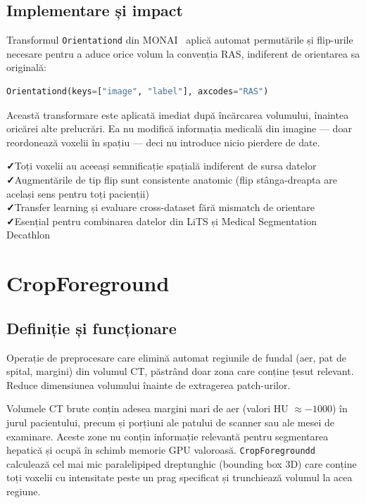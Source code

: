 \documentclass[12pt, a4paper]{report}
\newcommand{\pro}{\textcolor{accentgreen}{\textbf{✓}}\;}
\begin{document}
\subsection{Implementare și impact}

Transformul \texttt{Orientationd} din MONAI~\cite{cardoso2022monai} aplică automat permutările și flip-urile necesare
pentru a aduce orice volum la convenția RAS, indiferent de orientarea sa originală:

\begin{lstlisting}[language=Python]
Orientationd(keys=["image", "label"], axcodes="RAS")
\end{lstlisting}

Această transformare este aplicată imediat după încărcarea volumului, înaintea oricărei alte prelucrări.
Ea nu modifică informația medicală din imagine — doar reordonează voxelii în spațiu — deci
nu introduce nicio pierdere de date.

\begin{goodbox}
\pro Toți voxelii au aceeași semnificație spațială indiferent de sursa datelor \\
\pro Augmentările de tip flip sunt consistente anatomic (flip stânga-dreapta are același sens pentru toți pacienții) \\
\pro Transfer learning și evaluare cross-dataset fără mismatch de orientare \\
\pro Esențial pentru combinarea datelor din LiTS și Medical Segmentation Decathlon
\end{goodbox}

\section{CropForeground}
\label{sec:cropforeground}

\subsection{Definiție și funcționare}

\vspace{4pt}
\begin{infobox}
Operație de preprocesare care elimină automat regiunile de fundal
(aer, pat de spital, margini) din volumul CT, păstrând doar zona
care conține țesut relevant. Reduce dimensiunea volumului înainte
de extragerea patch-urilor.
\end{infobox}

Volumele CT brute conțin adesea margini mari de aer (valori HU $\approx -1000$) în jurul pacientului,
precum și porțiuni ale patului de scanner sau ale mesei de examinare. Aceste zone nu conțin
informație relevantă pentru segmentarea hepatică și ocupă în schimb memorie GPU valoroasă.
\texttt{CropForegroundd}~\cite{isensee2019automated, cardoso2022monai} calculează cel mai mic paralelipiped dreptunghic (bounding box 3D)
care conține toți voxelii cu intensitate peste un prag specificat și trunchiează volumul la acea regiune.
\end{document}
